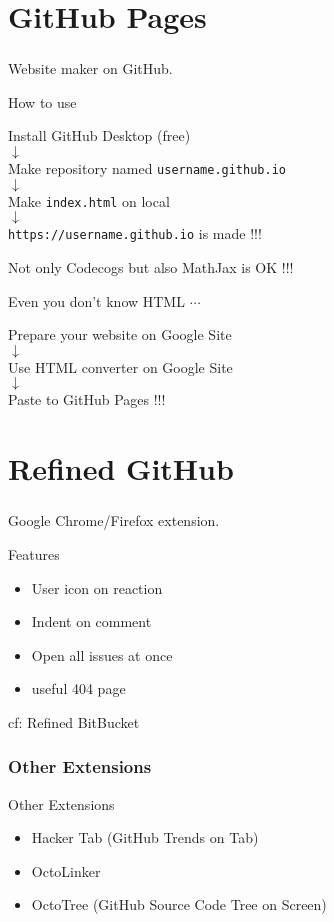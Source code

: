 \documentclass[dvipdfmx,10pt]{beamer}
\newcommand{\bb}{\begin{block}}
\newcommand{\eb}{\end{block}}
\newcommand{\ft}{\frametitle}
\begin{document}
\section{GitHub Pages}
\begin{frame}\ft{\insertsection}
\footnotesize
Website maker on GitHub.
\bb{How to use}
\begin{center}
Install GitHub Desktop (free)\\
$\downarrow$\\
Make repository named \texttt{username.github.io}\\
$\downarrow$\\
Make \texttt{index.html} on local\\
$\downarrow$\\
\texttt{https://username.github.io} is made !!!
\end{center}
\eb
Not only Codecogs but also MathJax is OK !!!
\bb{Even you don't know HTML $\cdots$}
\begin{center}
Prepare your website on Google Site \\
$\downarrow$\\
Use HTML converter on Google Site\\
$\downarrow$\\
Paste to GitHub Pages !!!
\end{center}
\eb
\normalsize
\end{frame}
\section{Refined GitHub}
\begin{frame}\ft{\insertsection}
Google Chrome/Firefox extension.
\begin{exampleblock}{Features}
\begin{itemize}
\item User icon on reaction
\item Indent on comment
\item Open all issues at once 
\item useful 404 page
\end{itemize}
\end{exampleblock}
cf: Refined BitBucket
\end{frame}
\begin{frame}\ft{Other Extensions}
\begin{exampleblock}{Other Extensions}
\begin{itemize}
\item Hacker Tab (GitHub Trends on Tab)
\item OctoLinker 
\item OctoTree (GitHub Source Code Tree on Screen)
\end{itemize}
\end{exampleblock}
\end{frame}
\end{document}
